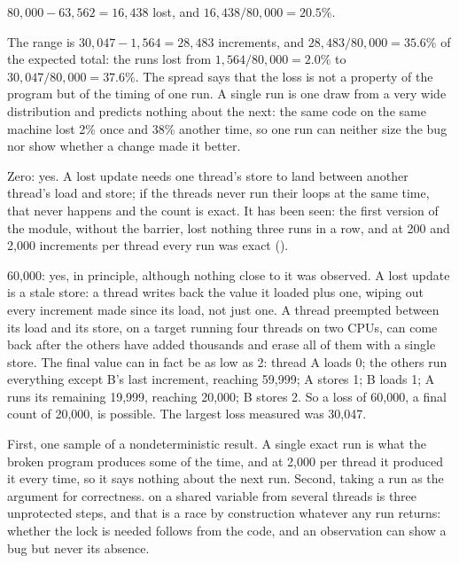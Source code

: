  $80{,}000 - 63{,}562 = 16{,}438$ lost, and $16{,}438 / 80{,}000 = 20.5\%$.

 The range is $30{,}047 - 1{,}564 = 28{,}483$ increments, and
$28{,}483 / 80{,}000 = 35.6\%$ of the expected total: the runs lost from $1{,}564 / 80{,}000 =
2.0\%$ to $30{,}047 / 80{,}000 = 37.6\%$. The spread says that the loss is not a property of the
program but of the timing of one run. A single run is one draw from a very wide distribution and
predicts nothing about the next: the same code on the same machine lost 2\% once and 38\% another
time, so one run can neither size the bug nor show whether a change made it better.

 Zero: yes. A lost update needs one thread's store to land between another thread's load
and store; if the threads never run their loops at the same time, that never happens and the count
is exact. It has been seen: the first version of the module, without the barrier, lost nothing
three runs in a row, and at 200 and 2,000 increments per thread every run was exact
().

60,000: yes, in principle, although nothing close to it was observed. A lost update is a stale
store: a thread writes back the value it loaded plus one, wiping out every increment made since its
load, not just one. A thread preempted between its load and its store, on a 
target running four threads on two CPUs, can come back after the others have added thousands and
erase all of them with a single store. The final value can in fact be as low as 2: thread A loads 0;
the others run everything except B's last increment, reaching 59,999; A stores 1; B loads 1; A runs
its remaining 19,999, reaching 20,000; B stores 2. So a loss of 60,000, a final count of 20,000, is
possible. The largest loss measured was 30,047.

 First, one sample of a nondeterministic result. A single exact run is what the broken
program produces some of the time, and at 2,000 per thread it produced it every time, so it says
nothing about the next run. Second, taking a run as the argument for correctness. 
on a shared variable from several threads is three unprotected steps, and that is a race by
construction whatever any run returns: whether the lock is needed follows from the code, and an
observation can show a bug but never its absence.


